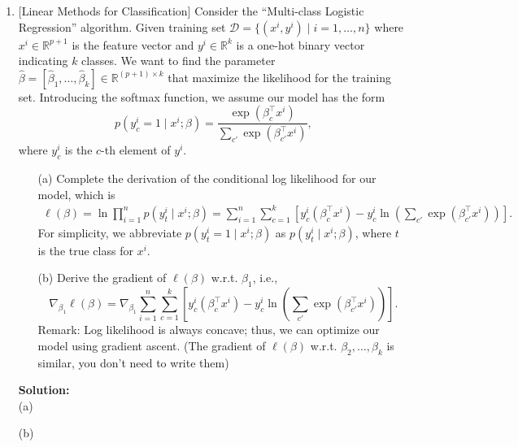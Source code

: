 \documentclass[10pt]{article}
\begin{document}
\begin{enumerate}[1.]
	\item {} [Linear Methods for Classification] 
	Consider the ``Multi-class Logistic Regression'' algorithm. Given training set 
	$\mathcal{D}=\{(x^i,y^i)\mid i=1,\ldots,n\}$ where $x^i\in \mathbb{R}^{p+1}$ is the 
	feature vector and $y^i\in \mathbb{R}^{k}$ is a one-hot binary vector indicating 
	$k$ classes. We want to find the parameter $\hat{\beta}=[\hat{\beta}_1,\ldots,\hat{\beta}_k]\in \mathbb{R}^{(p+1)\times k}$ 
	that maximize the likelihood for the training set. Introducing the softmax 
	function, we assume our model has the form 
	\[
		p(y_c^i=1\mid x^i;\beta) = \frac{\exp(\beta_c^\top x^i)}{\sum_{c'}\exp(\beta_{c'}^\top x^i)},
	\]
	where $y_c^i$ is the $c$-th element of $y^i$.
		  \begin{itemize}
			\item[(a)] Complete the derivation of the conditional log likelihood for our model, which is
			\begin{align*}
				\ell(\beta) = \ln \prod_{i=1}^{n} p(y_t^i\mid x^i;\beta)
				=\sum_{i=1}^{n}\sum_{c=1}^{k}\left[ y_c^i(\beta_c^\top x^i) - y_c^i\ln \left(\sum_{c'}\exp(\beta_{c'}^\top x^i) \right)\right].
			\end{align*}
			For simplicity, we abbreviate $p(y_t^i=1\mid x^i;\beta)$ as $p(y_t^i\mid x^i;\beta)$, where 
			$t$ is the true class for $x^i$.~
			\item[(b)] Derive the gradient of $\ell(\beta)$ w.r.t. $\beta_1$, i.e., 
			\[
				\nabla_{\beta_1}\ell(\beta) = \nabla_{\beta_1} \sum_{i=1}^{n}\sum_{c=1}^{k}\left[ y_c^i(\beta_c^\top x^i) - y_c^i\ln \left(\sum_{c'}\exp(\beta_{c'}^\top x^i) \right)\right].
			\]
			Remark: Log likelihood is always concave; thus, we can optimize our model 
			using gradient ascent. (The gradient of $\ell(\beta)$ w.r.t. $\beta_2,\ldots,\beta_k$ is similar, you don't need to write them)~
		  \end{itemize}
		  \textbf{Solution:}\\
		  (a) 






		  (b)







	      \newpage


\end{enumerate}
\end{document}

